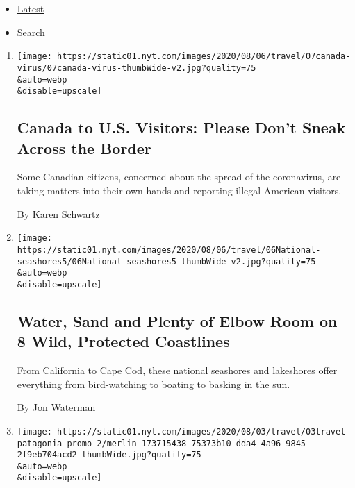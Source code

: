 \begin{itemize}
\tightlist
\item
  \protect\hyperlink{stream-panel}{Latest}
\item
  Search
\end{itemize}

\begin{enumerate}
\def\labelenumi{\arabic{enumi}.}
\item
  \href{/2020/08/07/travel/Canada-border-crossings-coronavirus.html}{}

  \texttt{[image: https://static01.nyt.com/images/2020/08/06/travel/07canada-virus/07canada-virus-thumbWide-v2.jpg?quality=75\\\&auto=webp\\\&disable=upscale]}

  \hypertarget{canada-to-us-visitors-please-dont-sneak-across-the-border}{%
  \subsection{Canada to U.S. Visitors: Please Don't Sneak Across the
  Border}\label{canada-to-us-visitors-please-dont-sneak-across-the-border}}

  Some Canadian citizens, concerned about the spread of the coronavirus,
  are taking matters into their own hands and reporting illegal American
  visitors.

  By Karen Schwartz
\item
  \href{/2020/08/06/travel/National-Seashores.html}{}

  \texttt{[image: https://static01.nyt.com/images/2020/08/06/travel/06National-seashores5/06National-seashores5-thumbWide-v2.jpg?quality=75\\\&auto=webp\\\&disable=upscale]}

  \hypertarget{water-sand-and-plenty-of-elbow-room-on-8-wild-protected-coastlines}{%
  \subsection{Water, Sand and Plenty of Elbow Room on 8 Wild, Protected
  Coastlines}\label{water-sand-and-plenty-of-elbow-room-on-8-wild-protected-coastlines}}

  From California to Cape Cod, these national seashores and lakeshores
  offer everything from bird-watching to boating to basking in the sun.

  By Jon Waterman
\item
  \href{/2020/08/03/travel/remote-schools-patagonia.html}{}

  \texttt{[image: https://static01.nyt.com/images/2020/08/03/travel/03travel-patagonia-promo-2/merlin\_173715438\_75373b10-dda4-4a96-9845-2f9eb704acd2-thumbWide.jpg?quality=75\\\&auto=webp\\\&disable=upscale]}


\end{enumerate}
